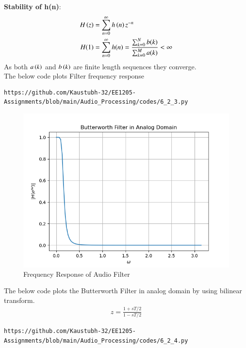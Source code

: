 \documentclass[journal,12pt,twocolumn]{IEEEtran}
\theoremstyle{remark}
\begin{document}
\begin{enumerate}[label=\thesection.\arabic*]
\textbf{Stability of h(n)}:\\
\begin{align}
H\left(z\right) &= \sum_{n = 0}^{\infty} h\left(n\right)z^{-n}\\
H(1)&= \sum_{n = 0}^{\infty}h(n)  = \frac{\sum_{k = 0}^{N}b(k)}{\sum_{k = 0}^{M}a(k)}< \infty
\end{align}
As both $a\left(k\right)$ and $b\left(k\right)$ are finite length sequences they converge.\\
The below code plots Filter frequency response
\begin{lstlisting}
https://github.com/Kaustubh-32/EE1205-Assignments/blob/main/Audio_Processing/codes/6_2_3.py
\end{lstlisting}
\begin{figure}[H]
\centering
\includegraphics[width=1\columnwidth]{6_2_3.png}
\caption{Frequency Response of Audio Filter}
\label{fig:H(w)_6}
\end{figure}
The below code plots the Butterworth Filter in analog domain by using bilinear transform.
\begin{align}
    z=\frac{1+sT/2}{1-sT/2}
\end{align}
\begin{lstlisting}
https://github.com/Kaustubh-32/EE1205-Assignments/blob/main/Audio_Processing/codes/6_2_4.py
\end{lstlisting}
\begin{figure}[H]
\centering

\end{figure}
\end{enumerate}
\end{document}
